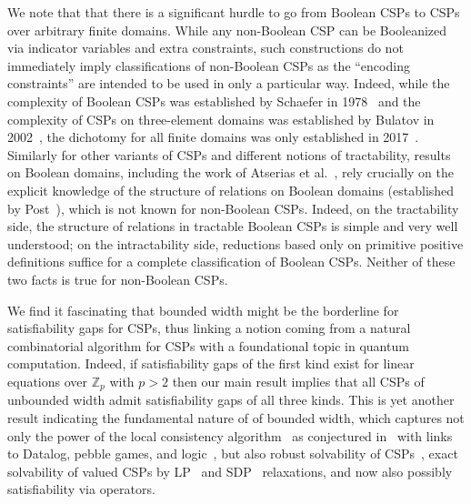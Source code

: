 We note that that there is a significant hurdle to go from Boolean CSPs to CSPs
over arbitrary finite domains. While any non-Boolean CSP can be Booleanized via
indicator variables and extra constraints, such constructions do not
immediately imply classifications of non-Boolean CSPs as the ``encoding
constraints'' are intended to be used in only a particular way. Indeed, while
the complexity of Boolean CSPs was established by Schaefer in
1978~\cite{Schaefer78:stoc} and the complexity of CSPs on three-element domains
was established by Bulatov in 2002~\cite{Bulatov02:focs,Bulatov06:jacm}, the
dichotomy for all finite domains was only established in
2017~\cite{Bulatov17:focs,Zhuk17:focs,Zhuk20:jacm}.
%
Similarly for other variants of CSPs and different notions of tractability,
results on Boolean domains, including the work of Atserias et
al.~\cite{AKS19:jcss}, rely crucially on the explicit knowledge of the structure
of relations on Boolean domains (established by Post~\cite{Post41}), which is not known for non-Boolean CSPs.
%
Indeed, on the tractability side, the structure of relations in tractable Boolean CSPs is simple and very well understood; on the intractability side, reductions based only on primitive positive definitions suffice for a complete classification of Boolean CSPs. Neither of these two facts is true for non-Boolean CSPs.

We find it fascinating that bounded width might be the borderline for
satisfiability gaps for CSPs, thus linking a notion coming from a
natural combinatorial algorithm for CSPs with a foundational topic in quantum
computation. 
%
Indeed, if satisfiability gaps of the first kind exist for linear equations over
$\mathbb{Z}_p$ with $p>2$ then our main result implies that all CSPs of
unbounded width admit satisfiability gaps of all three kinds.
% 
This is yet another result indicating the fundamental nature of of bounded
width, which captures not only the power of the local consistency
algorithm~\cite{LaroseZadori07:au,Maroti2008existence,Bulatov09:width,Barto14:local}
as conjectured in~\cite{Feder98:monotone} with links to Datalog, pebble games,
and logic~\cite{Feder98:monotone,Kolaitis00:jcss}, but also robust solvability
of CSPs~\cite{Barto16:sicomp}, exact solvability of valued CSPs by
LP~\cite{tz17:sicomp} and SDP~\cite{tz18} relaxations, and now also
possibly satisfiability via operators.





